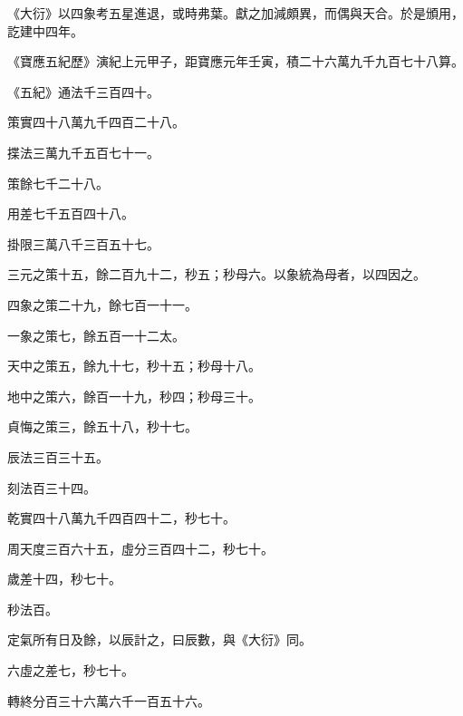 \begin{pinyinscope}
 《大衍》以四象考五星進退，或時弗葉。獻之加減頗異，而偶與天合。於是頒用，訖建中四年。



 《寶應五紀歷》演紀上元甲子，距寶應元年壬寅，積二十六萬九千九百七十八算。



 《五紀》通法千三百四十。



 策實四十八萬九千四百二十八。



 揲法三萬九千五百七十一。



 策餘七千二十八。



 用差七千五百四十八。



 掛限三萬八千三百五十七。



 三元之策十五，餘二百九十二，秒五；秒母六。以象統為母者，以四因之。



 四象之策二十九，餘七百一十一。



 一象之策七，餘五百一十二太。



 天中之策五，餘九十七，秒十五；秒母十八。



 地中之策六，餘百一十九，秒四；秒母三十。



 貞悔之策三，餘五十八，秒十七。



 辰法三百三十五。



 刻法百三十四。



 乾實四十八萬九千四百四十二，秒七十。



 周天度三百六十五，虛分三百四十二，秒七十。



 歲差十四，秒七十。



 秒法百。



 定氣所有日及餘，以辰計之，曰辰數，與《大衍》同。



 六虛之差七，秒七十。



 轉終分百三十六萬六千一百五十六。




\end{pinyinscope}
